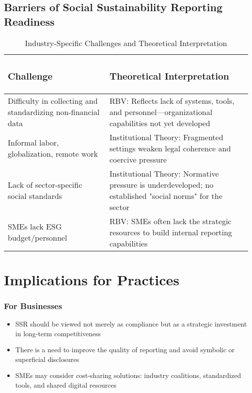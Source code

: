 \subsection{Barriers of Social Sustainability Reporting Readiness}

\begin{table}[H]
    \centering
    \caption{Industry-Specific Challenges and Theoretical Interpretation}
    \begin{tabular}{p{6cm}|p{8cm}}
        \subsubsection{Challenge} & \subsubsection{Theoretical Interpretation} \\
        \hline
        Difficulty in collecting and standardizing non-financial data & RBV: Reflects lack of systems, tools, and personnel—organizational capabilities not yet developed \\
        \hline
        Informal labor, globalization, remote work & Institutional Theory: Fragmented settings weaken legal coherence and coercive pressure \\
        \hline
        Lack of sector-specific social standards & Institutional Theory: Normative pressure is underdeveloped; no established "social norms" for the sector \\
        \hline
        SMEs lack ESG budget/personnel & RBV: SMEs often lack the strategic resources to build internal reporting capabilities
    \end{tabular}
\end{table}

\section{Implications for Practices}
\subsubsection{For Businesses}
\begin{itemize}
    \item SSR should be viewed not merely as compliance but as a strategic investment in long-term competitiveness \parencite{Barker2025}
    \item There is a need to improve the quality of reporting and avoid symbolic or superficial disclosures \parencite{Nava2023}
    \item SMEs may consider cost-sharing solutions: industry coalitions, standardized tools, and shared digital resources \parencite{Najjar2024}
\end{itemize}

